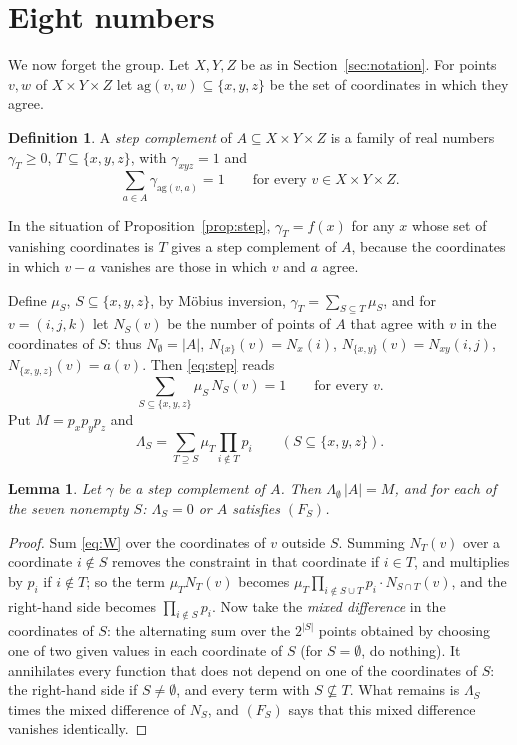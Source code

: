 \documentclass[11pt,a4paper]{amsart}
\newtheorem{lemma}[theorem]{Lemma}
\theoremstyle{definition}
\newtheorem{definition}[theorem]{Definition}
\theoremstyle{remark}
\begin{document}
\section{Eight numbers}\label{sec:eight}

We now forget the group. Let $X,Y,Z$ be as in Section~\ref{sec:notation}. For points $v,w$ of $X\times Y\times Z$
let $\mathrm{ag}(v,w)\subseteq\{x,y,z\}$ be the set of coordinates in which they agree.

\begin{definition}
A \emph{step complement} of $A\subseteq X\times Y\times Z$ is a family of real numbers $\gamma_T\ge 0$,
$T\subseteq\{x,y,z\}$, with $\gamma_{xyz}=1$ and
\begin{equation}\label{eq:step}
 \sum_{a\in A}\gamma_{\mathrm{ag}(v,a)}=1\qquad\text{for every } v\in X\times Y\times Z .
\end{equation}
\end{definition}

In the situation of Proposition~\ref{prop:step}, $\gamma_T=f(x)$ for any $x$ whose set of vanishing coordinates
is $T$ gives a step complement of $A$, because the coordinates in which $v-a$ vanishes are those in which $v$ and
$a$ agree.

Define $\mu_S$, $S\subseteq\{x,y,z\}$, by M\"obius inversion, $\gamma_T=\sum_{S\subseteq T}\mu_S$, and for
$v=(i,j,k)$ let $N_S(v)$ be the number of points of $A$ that agree with $v$ in the coordinates of $S$: thus
$N_\emptyset=|A|$, $N_{\{x\}}(v)=N_x(i)$, $N_{\{x,y\}}(v)=N_{xy}(i,j)$, $N_{\{x,y,z\}}(v)=a(v)$. Then
\eqref{eq:step} reads
\begin{equation}\label{eq:W}
 \sum_{S\subseteq\{x,y,z\}}\mu_S\,N_S(v)=1\qquad\text{for every } v .
\end{equation}
Put $M=p_xp_yp_z$ and
\[
 \Lambda_S=\sum_{T\supseteq S}\mu_T\prod_{i\notin T}p_i\qquad(S\subseteq\{x,y,z\}).
\]

\begin{lemma}\label{lem:dich}
Let $\gamma$ be a step complement of $A$. Then $\Lambda_\emptyset\,|A|=M$, and for each of the seven nonempty $S$:
$\Lambda_S=0$ or $A$ satisfies $(F_S)$.
\end{lemma}
\begin{proof}
Sum \eqref{eq:W} over the coordinates of $v$ outside $S$. Summing $N_T(v)$ over a coordinate $i\notin S$ removes
the constraint in that coordinate if $i\in T$, and multiplies by $p_i$ if $i\notin T$; so the term $\mu_TN_T(v)$
becomes $\mu_T\prod_{i\notin S\cup T}p_i\cdot N_{S\cap T}(v)$, and the right-hand side becomes
$\prod_{i\notin S}p_i$. Now take the \emph{mixed difference} in the coordinates of $S$: the alternating sum over
the $2^{|S|}$ points obtained by choosing one of two given values in each coordinate of $S$ (for $S=\emptyset$, do
nothing). It annihilates every function that does not depend on one of the coordinates of $S$: the right-hand
side if $S\ne\emptyset$, and every term with $S\not\subseteq T$. What remains is $\Lambda_S$ times the mixed
difference of $N_S$, and $(F_S)$ says that this mixed difference vanishes identically.
\end{proof}
\end{document}
